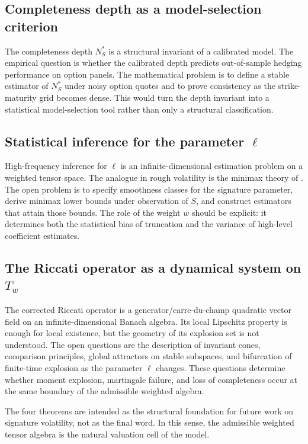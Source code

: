 \documentclass[11pt,oneside]{article}
\theoremstyle{plain}
\theoremstyle{definition}
\theoremstyle{remark}
\newcommand{\Tw}{T_w}
\begin{document}
\subsection{Completeness depth as a model-selection criterion}
The completeness depth $N_S^\ast$ is a structural invariant of a calibrated model. The empirical question is whether the calibrated depth predicts out-of-sample hedging performance on option panels. The mathematical problem is to define a stable estimator of $N_S^\ast$ under noisy option quotes and to prove consistency as the strike-maturity grid becomes dense. This would turn the depth invariant into a statistical model-selection tool rather than only a structural classification.

\subsection{Statistical inference for the parameter $\ell$}
High-frequency inference for $\ell$ is an infinite-dimensional estimation problem on a weighted tensor space. The analogue in rough volatility is the minimax theory of \citet{ChongHoffmannLiuRosenbaumSzymanski2024}. The open problem is to specify smoothness classes for the signature parameter, derive minimax lower bounds under observation of $S$, and construct estimators that attain those bounds. The role of the weight $w$ should be explicit: it determines both the statistical bias of truncation and the variance of high-level coefficient estimates.

\subsection{The Riccati operator as a dynamical system on $\Tw$}
The corrected Riccati operator is a generator/carre-du-champ quadratic vector field on an infinite-dimensional Banach algebra. Its local Lipschitz property is enough for local existence, but the geometry of its explosion set is not understood. The open questions are the description of invariant cones, comparison principles, global attractors on stable subspaces, and bifurcation of finite-time explosion as the parameter $\ell$ changes. These questions determine whether moment explosion, martingale failure, and loss of completeness occur at the same boundary of the admissible weighted algebra.

The four theorems are intended as the structural foundation for future work on signature volatility, not as the final word. In this sense, the admissible weighted tensor algebra is the natural valuation cell of the model.
\end{document}
